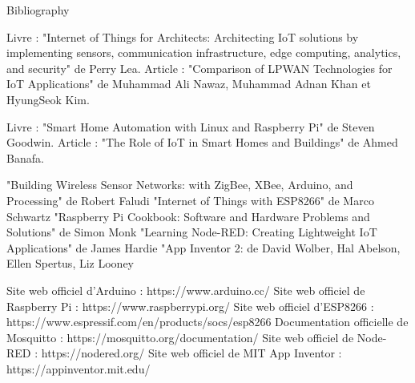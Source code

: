 
Bibliography
\begin{flushleft}
Livre : "Internet of Things for Architects: Architecting IoT solutions by implementing sensors, communication infrastructure, edge computing, analytics, and security" de Perry Lea.
Article : "Comparison of LPWAN Technologies for IoT Applications" de Muhammad Ali Nawaz, Muhammad Adnan Khan et HyungSeok Kim.


Livre : "Smart Home Automation with Linux and Raspberry Pi" de Steven Goodwin.
Article : "The Role of IoT in Smart Homes and Buildings" de Ahmed Banafa.

"Building Wireless Sensor Networks: with ZigBee, XBee, Arduino, and Processing" de Robert Faludi
"Internet of Things with ESP8266" de Marco Schwartz
"Raspberry Pi Cookbook: Software and Hardware Problems and Solutions" de Simon Monk
"Learning Node-RED: Creating Lightweight IoT Applications" de James Hardie
"App Inventor 2:  de David Wolber, Hal Abelson, Ellen Spertus, Liz Looney

Site web officiel d'Arduino : https://www.arduino.cc/ \newline
Site web officiel de Raspberry Pi : https://www.raspberrypi.org/  \newline
Site web officiel d'ESP8266 : https://www.espressif.com/en/products/socs/esp8266 \newline
Documentation officielle de Mosquitto : https://mosquitto.org/documentation/
Site web officiel de Node-RED : https://nodered.org/
Site web officiel de MIT App Inventor : https://appinventor.mit.edu/ 


\end{flushleft}